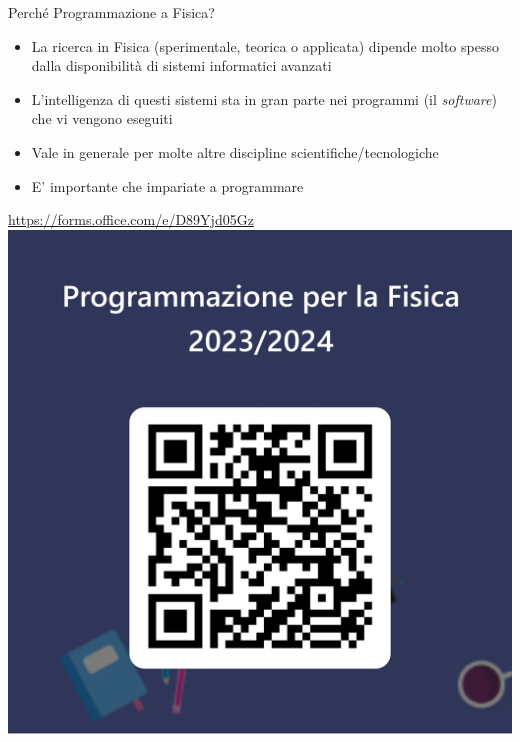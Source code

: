 \begin{frame}{Perché Programmazione a Fisica? \insertcontinuationtext}

  \begin{itemize}
  \item<2-> La ricerca in Fisica (sperimentale, teorica o applicata) dipende
    molto spesso dalla disponibilità di sistemi informatici avanzati
  \item<3-> L'intelligenza di questi sistemi sta in gran parte nei programmi (il
    \textit{software}) che vi vengono eseguiti
  \item<4-> Vale in generale per molte altre discipline scientifiche/tecnologiche
  \item<5-> E' importante che impariate a programmare
  \end{itemize}

  \vskip 1cm

\end{frame}
\begin{frame}
  \begin{center}
    \vfill
    \url{https://forms.office.com/e/D89Yjd05Gz}
    \vfill
    \includegraphics[trim={400 200 400 600},clip,height=.6\textheight]{images/sondaggio-qr.png}
    \vfill
  \end{center}
\end{frame}

